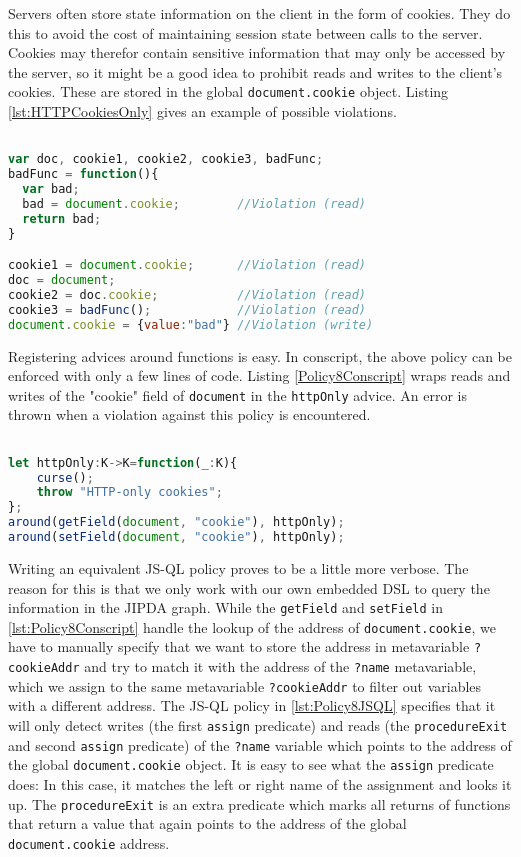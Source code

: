 Servers often store state information on the client in the form of cookies. They do this to avoid the cost of maintaining session state between calls to the server. Cookies may therefor contain sensitive information that may only be accessed by the server, so it might be a good idea to prohibit reads and writes to the client's cookies. These are stored in the global \texttt{document.cookie} object. Listing \ref{lst:HTTPCookiesOnly} gives an example of possible violations.

\begin{lstlisting}[label={lst:HTTPCookiesOnly},language=JavaScript,caption=HTTP-cookies only example,mathescape=true]  % float=t?

var doc, cookie1, cookie2, cookie3, badFunc;
badFunc = function(){
  var bad;
  bad = document.cookie;        //Violation (read)
  return bad;
}

cookie1 = document.cookie;      //Violation (read)
doc = document;
cookie2 = doc.cookie;           //Violation (read)
cookie3 = badFunc();            //Violation (read)
document.cookie = {value:"bad"} //Violation (write)
\end{lstlisting}

Registering advices around functions is easy. In conscript, the above policy can be enforced with only a few lines of code. Listing \ref{Policy8Conscript} wraps reads and writes of the "cookie" field of \texttt{document} in the \texttt{httpOnly} advice. An error is thrown when a violation against this policy is encountered.

\begin{lstlisting}[label={lst:Policy8Conscript},language=JavaScript,caption=Policy 8 in ConScript,mathescape=true]  % float=t?

let httpOnly:K->K=function(_:K){ 
    curse(); 
    throw "HTTP-only cookies"; 
};
around(getField(document, "cookie"), httpOnly); 
around(setField(document, "cookie"), httpOnly);
\end{lstlisting}

Writing an equivalent JS-QL policy proves to be a little more verbose. The reason for this is that we only work with our own embedded DSL to query the information in the JIPDA graph. While the \texttt{getField} and \texttt{setField} in \ref{lst:Policy8Conscript} handle the lookup of the address of \texttt{document.cookie}, we have to manually specify that we want to store the address in metavariable \texttt{?cookieAddr} and try to match it with the address of the \texttt{?name} metavariable, which we assign to the same metavariable \texttt{?cookieAddr} to filter out variables with a different address. The JS-QL policy in \ref{lst:Policy8JSQL} specifies that it will only detect writes (the first \texttt{assign} predicate) and reads (the \texttt{procedureExit} and second \texttt{assign} predicate) of the \texttt{?name} variable which points to the address of the global \texttt{document.cookie} object. It is easy to see what the \texttt{assign} predicate does: In this case, it matches the left or right name of the assignment and looks it up. The \texttt{procedureExit} is an extra predicate which marks all returns of functions that return a value that again points to the address of the global \texttt{document.cookie} address.


